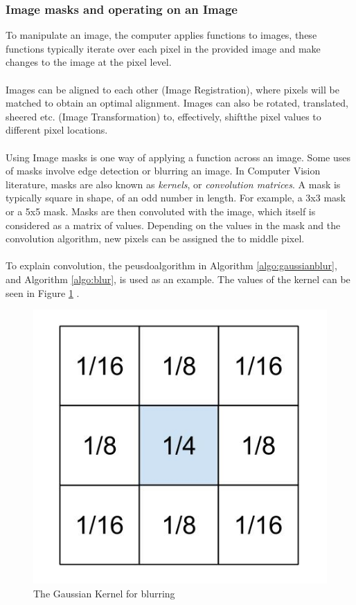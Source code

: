 \documentclass[11pt]{article}
\begin{document}
\subsubsection{Image masks and operating on an Image}
To manipulate an image, the computer applies functions to images,
these functions typically iterate over each pixel in the provided image and
make changes to the image at the pixel level.\\
\\
Images can be aligned to each other (Image Registration), where pixels
will be matched to obtain an optimal alignment. Images can also
be rotated, translated, sheered etc. (Image Transformation) to, effectively,
shiftthe pixel values to different pixel locations. \\
\\
Using Image masks is one way of applying a function across an image.
Some uses of masks involve edge detection or blurring an image. In
Computer Vision literature, masks are also known as \textit{kernels},
or \textit{convolution matrices}. A mask is typically square in shape,
of an odd number in length. For example, a 3x3 mask or a 5x5 mask. 
Masks are then convoluted with the image, which itself is considered as
a matrix of values. Depending on the values in the mask and the convolution
algorithm, new pixels can be assigned the to middle pixel.\\
\\
To explain convolution, the peusdoalgorithm in Algorithm 
\ref{algo:gaussianblur}, and Algorithm \ref{algo:blur}, is used as an example.
The values of the kernel can be seen in Figure \ref{fig:gaussiankernel} .

\begin{figure}
	\centering
	\includegraphics[scale=0.3]{pics/gaussiankernel.jpg}
	\caption{The Gaussian Kernel for blurring}
	\label{fig:gaussiankernel}
\end{figure}
\end{document}
